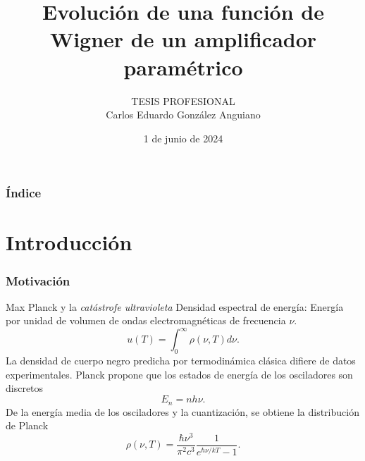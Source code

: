 \documentclass[xcolor=dvipsnames,slidestop,compress,mathserif, 11pt]{beamer}
\title[Tesis profesional]{Evoluci\'on de una funci\'on de Wigner de un amplificador param\'etrico}
\author{TESIS PROFESIONAL\\
Carlos Eduardo González Anguiano}
\institute{Departamento de Física ESFM-IPN}
\date{1 de junio de 2024}
\begin{document}
\maketitle


\begin{frame}
	\frametitle{Índice}
	\tableofcontents[pausesections]
\end{frame}

\section{Introducción}

\begin{frame}[c]
	\frametitle{Motivación}
	Max Planck y la \textit{catástrofe ultravioleta}
	Densidad espectral de energía: Energía por unidad de volumen de ondas electromagnéticas de frecuencia $\nu$.
	\begin{equation}
		u(T)=\int_{0}^{\infty}\rho(\nu, T)d\nu.
	\end{equation}
	La densidad de cuerpo negro predicha por termodinámica clásica difiere de datos experimentales.
	Planck propone que los estados de energía de los osciladores son discretos
	\begin{equation}
		E_n = nh\nu.
	\end{equation}
	De la energía media de los osciladores y la cuantización, se obtiene la distribución de Planck
	\begin{equation}
		\rho(\nu, T) = \frac{\hbar \nu^3}{\pi^2 c^3} \frac{1}{e^{\hbar\nu/kT}-1}.
	\end{equation}
\end{frame}
\end{document}
